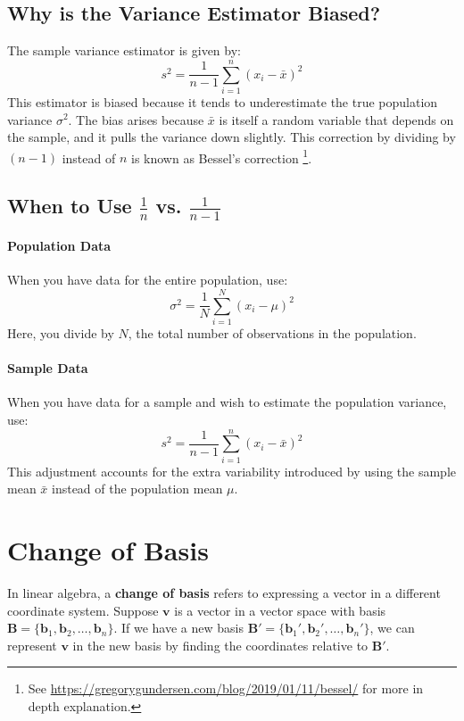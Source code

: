 \documentclass[]{article}
\begin{document}
	\subsection{Why is the Variance Estimator Biased?}
	The sample variance estimator is given by:
	$$
	s^2 = \frac{1}{n-1} \sum_{i=1}^n (x_i - \bar{x})^2
	$$
	This estimator is biased because it tends to underestimate the true population variance $\sigma^2$.
	The bias arises because $\bar{x}$ is itself a random variable that depends on the sample, and it pulls the variance down slightly.
	This correction by dividing by $(n-1)$ instead of $n$ is known as Bessel's correction \footnote{See \url{https://gregorygundersen.com/blog/2019/01/11/bessel/} for more in depth explanation.}.
	
	\subsection{When to Use $\frac{1}{n}$ vs. $\frac{1}{n-1}$}
	\paragraph{Population Data}
	When you have data for the entire population, use:
	$$
	\sigma^2 = \frac{1}{N} \sum_{i=1}^N (x_i - \mu)^2
	$$
	Here, you divide by $N$, the total number of observations in the population.
	
	\paragraph{Sample Data}
	When you have data for a sample and wish to estimate the population variance, use:
	$$
	s^2 = \frac{1}{n-1} \sum_{i=1}^n (x_i - \bar{x})^2
	$$
	This adjustment accounts for the extra variability introduced by using the sample mean $\bar{x}$ instead of the population mean $\mu$.
	
	\section{Change of Basis}
	In linear algebra, a \textbf{change of basis} refers to expressing a vector in a different coordinate system.
	Suppose $\mathbf{v}$ is a vector in a vector space with basis $\mathbf{B} = \{\mathbf{b}_1, \mathbf{b}_2, \dots, \mathbf{b}_n\}$.
	If we have a new basis $\mathbf{B}' = \{\mathbf{b}_1', \mathbf{b}_2', \dots, \mathbf{b}_n'\}$, we can represent $\mathbf{v}$ in the new basis by finding the coordinates relative to $\mathbf{B}'$.
	
\end{document}
